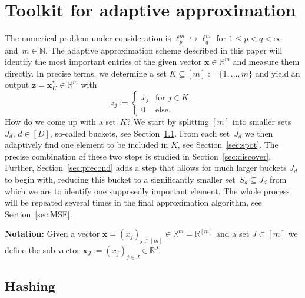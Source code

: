 \documentclass[12pt]{article}
\theoremstyle{plain}
\theoremstyle{definition}
\newcommand{\embed}{\hookrightarrow}
\renewcommand{\vec}{\boldsymbol}
\newcommand{\R}{{\mathbb R}}
\newcommand{\N}{{\mathbb N}}
\begin{document}
\section{Toolkit for adaptive approximation}
\label{sec:tools}

The numerical problem under consideration is $\ell_p^m \embed \ell_q^m$ for $1 \leq p < q < \infty$ and~$m \in \N$.
The adaptive approximation scheme described in this paper
will identify the most important entries of the given vector $\vec{x} \in \R^m$ and measure them directly.
In precise terms, we determine a set $K \subseteq [m] := \{1,\ldots,m\}$ and yield an output $\vec{z} = \vec{x}^\ast_K \in \R^m$ with
\begin{equation} \label{eq:x_K*}
    z_j := \begin{cases}
        x_j &\text{for } j \in K, \\
        0 &\text{else.}
    \end{cases}
\end{equation}
How do we come up with a set~$K$?
We start by splitting $[m]$ into smaller sets~$J_d$, $d \in [D]$, so-called buckets, see Section~\ref{sec:hash}.
From each set~$J_d$ we then adaptively find one element to be included in $K$, see Section~\ref{sec:spot}.
The precise combination of these two steps is studied in Section~\ref{sec:discover}.
Further, Section~\ref{sec:precond} adds a step that allows for much larger buckets $J_d$ to begin with,
reducing this bucket to a significantly smaller set~$S_d \subseteq J_d$ from which we are to identify one supposedly important element.
The whole process will be repeated several times in the final approximation algorithm, see Section~\ref{sec:MSF}.

\textbf{Notation:} Given a vector $\vec{x} = (x_j)_{j\in [m]} \in \R^m = \R^{[m]}$ and a set $J \subset [m]$ we define the sub-vector $\vec{x}_J := (x_j)_{j \in J} \in \R^J$.


\subsection{Hashing}
\label{sec:hash}
\end{document}

